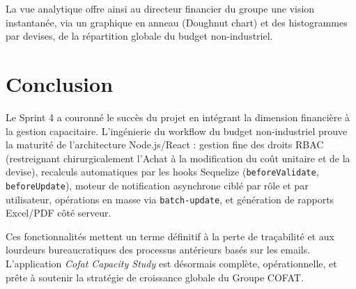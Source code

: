 La vue analytique offre ainsi au directeur financier du groupe une vision instantanée, via un graphique en anneau (Doughnut chart) et des histogrammes par devises, de la répartition globale du budget non-industriel.

\section{Conclusion}
Le Sprint 4 a couronné le succès du projet en intégrant la dimension financière à la gestion capacitaire. L'ingénierie du workflow du budget non-industriel prouve la maturité de l'architecture Node.js/React : gestion fine des droits RBAC (restreignant chirurgicalement l'Achat à la modification du coût unitaire et de la devise), recalculs automatiques par les hooks Sequelize (\texttt{beforeValidate}, \texttt{beforeUpdate}), moteur de notification asynchrone ciblé par rôle et par utilisateur, opérations en masse via \texttt{batch-update}, et génération de rapports Excel/PDF côté serveur.

Ces fonctionnalités mettent un terme définitif à la perte de traçabilité et aux lourdeurs bureaucratiques des processus antérieurs basés sur les emails. L'application \textit{Cofat Capacity Study} est désormais complète, opérationnelle, et prête à soutenir la stratégie de croissance globale du Groupe COFAT.
